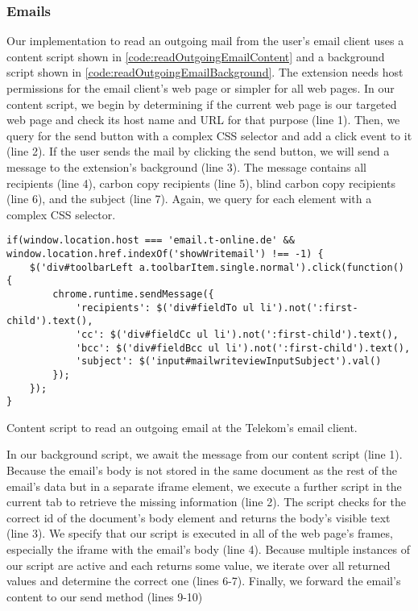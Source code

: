 \subsubsection{Emails}
		
	Our implementation to read an outgoing mail from the user's email client uses a content script shown in \autoref{code:readOutgoingEmailContent} and a background script shown in \autoref{code:readOutgoingEmailBackground}. The extension needs host permissions for the email client's web page or simpler for all web pages. In our content script, we begin by determining if the current web page is our targeted web page and check its host name and URL for that purpose (line 1). Then, we query for the send button with a complex CSS selector and add a click event to it (line 2). If the user sends the mail by clicking the send button, we will send a message to the extension's background (line 3). The message contains all recipients (line 4), carbon copy recipients (line 5), blind carbon copy recipients (line 6), and the subject (line 7). Again, we query for each element with a complex CSS selector.
	
	\begin{code}
		\begin{lstlisting}
if(window.location.host === 'email.t-online.de' && window.location.href.indexOf('showWritemail') !== -1) {
	$('div#toolbarLeft a.toolbarItem.single.normal').click(function() {
		chrome.runtime.sendMessage({
			'recipients': $('div#fieldTo ul li').not(':first-child').text(),
			'cc': $('div#fieldCc ul li').not(':first-child').text(),
			'bcc': $('div#fieldBcc ul li').not(':first-child').text(),
			'subject': $('input#mailwriteviewInputSubject').val()
		});
	});
}
\end{lstlisting}
		\caption{Content script to read an outgoing email at the Telekom's email client.}
		\label{code:readOutgoingEmailContent}
	\end{code}
	
	In our background script, we await the message from our content script (line 1). Because the email's body is not stored in the same document as the rest of the email's data but in a separate iframe element, we execute a further script in the current tab to retrieve the missing information (line 2). The script checks for the correct id of the document's body element and returns the body's visible text (line 3). We specify that our script is executed in all of the web page's frames, especially the iframe with the email's body (line 4). Because multiple instances of our script are active and each returns some value, we iterate over all returned values and determine the correct one (lines 6-7). Finally, we forward the email's content to our send method (lines 9-10) 
	
